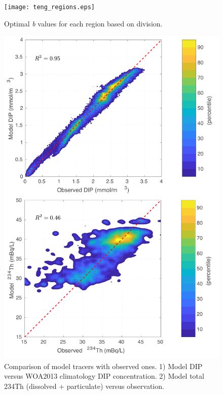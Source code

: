 \clearpage
\begin{figure}[!htb]
\texttt{[image: teng\_regions.eps]}
\caption{Optimal \textit{b} values for each region based on \cite{Teng2014} division.}
\label{fig:b}
\end{figure}

\clearpage
\begin{figure}[!htb]
\includegraphics[width=1.0\textwidth,center]{MvsO.pdf}
\caption{Comparison of model tracers with observed ones.  1) Model DIP versus WOA2013 climatology DIP concentration. 2) Model total 234Th (dissolved + particulate) versus observation.}
\label{fig:MvsO}
\end{figure}

